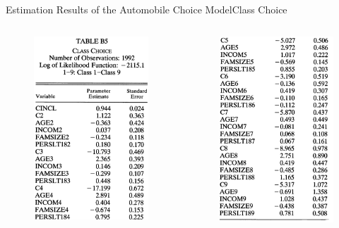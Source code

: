\documentclass{beamer}
\begin{document}
\begin{frame}{Estimation Results of the Automobile Choice Model}{Class Choice}
	\begin{columns}
		\begin{figure}[h]
			\centering
			\includegraphics[width=4.6cm]{table_b51.png}
		\end{figure}
		\begin{figure}[h]
			\centering
			\includegraphics[width=4.6cm]{table_b52.png}
		\end{figure}
	\end{columns}
\end{frame}
\end{document}
